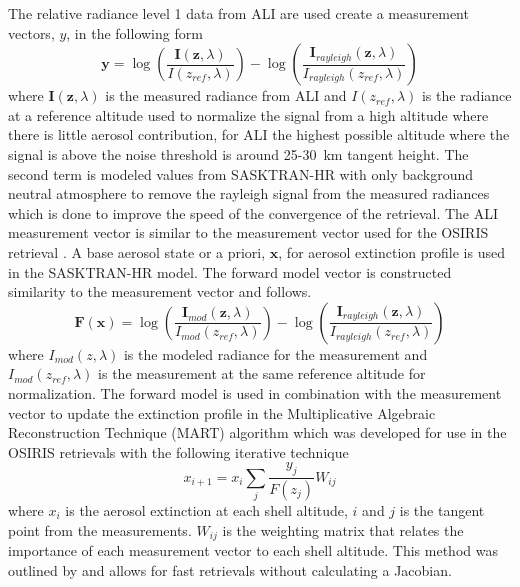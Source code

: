 \documentclass[12pt]{article}
\begin{document}
The relative radiance level 1 data from ALI are used create a measurement vectors, $y$, in the following form
\begin{equation}
    \mathbf{y} = \log\left(\frac{\mathbf{I}(\mathbf{z},\lambda)}{I(z_{ref},\lambda)}\right)-\log\left(\frac{\mathbf{I}_{rayleigh}(\mathbf{z},\lambda)}{I_{rayleigh}(z_{ref},\lambda)}\right)
    \label{eqn:measurementVector}
\end{equation}
where $\mathbf{I}(\mathbf{z},\lambda)$ is the measured radiance from ALI and $I(z_{ref},\lambda)$ is the radiance at a reference altitude used to normalize the signal from a high altitude where there is little aerosol contribution, for ALI the highest possible altitude where the signal is above the noise threshold is around 25-30~km tangent height. The second term is modeled values from SASKTRAN-HR with only background neutral atmosphere to remove the rayleigh signal from the measured radiances which is done to improve the speed of the convergence of the retrieval. The ALI measurement vector is similar to the measurement vector used for the OSIRIS retrieval \citep{Bourassa2007,Bourassa2011}. A base aerosol state or a priori, $\mathbf{x}$, for aerosol extinction profile is used in the SASKTRAN-HR model. The forward model vector is constructed similarity to the measurement vector and follows.
\begin{equation}
    \mathbf{F}(\mathbf{x}) = \log\left(\frac{\mathbf{I}_{mod}(\mathbf{z},\lambda)}{I_{mod}(z_{ref},\lambda)}\right)-\log\left(\frac{\mathbf{I}_{rayleigh}(\mathbf{z},\lambda)}{I_{rayleigh}(z_{ref},\lambda)}\right)
    \label{eqn:forwardModel}
\end{equation}
where $I_{mod}(z,\lambda)$ is the modeled radiance for the measurement and $I_{mod}(z_{ref},\lambda)$ is the measurement at the same reference altitude for normalization. The forward model is used in combination with the measurement vector to update the extinction profile in the Multiplicative Algebraic Reconstruction Technique (MART) algorithm which was developed for use in the OSIRIS retrievals \citep{Bourassa2012a} with the following iterative technique
\begin{equation}
    x_{i+1} = x_{i}\sum_{j}\frac{y_{j}}{F(z_{j})}W_{ij}
\end{equation}
where $x_{i}$ is the aerosol extinction at each shell altitude, $i$ and $j$ is the tangent point from the measurements. $W_{ij}$ is the weighting matrix that relates the importance of each measurement vector to each shell altitude. This method was outlined by \cite{Degenstein2009} and allows for fast retrievals without calculating a Jacobian.
\end{document}
